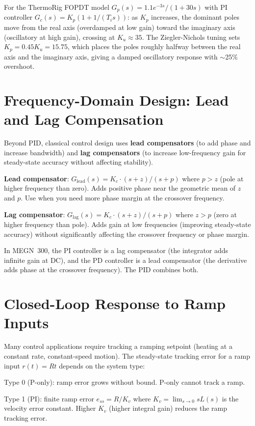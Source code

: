 \documentclass[11pt,letterpaper,twoside,openany]{book}
\begin{document}
For the ThermoRig FOPDT model $G_p(s) = 1.1 e^{-3s}/(1+30s)$ with PI controller $G_c(s) = K_p(1 + 1/(T_i s))$: as $K_p$ increases, the dominant poles move from the real axis (overdamped at low gain) toward the imaginary axis (oscillatory at high gain), crossing at $K_u \approx 35$. The Ziegler-Nichols tuning sets $K_p = 0.45 K_u = 15.75$, which places the poles roughly halfway between the real axis and the imaginary axis, giving a damped oscillatory response with $\sim$25\% overshoot.

\section{Frequency-Domain Design: Lead and Lag Compensation}
Beyond PID, classical control design uses \textbf{lead compensators} (to add phase and increase bandwidth) and \textbf{lag compensators} (to increase low-frequency gain for steady-state accuracy without affecting stability).

\textbf{Lead compensator}: $G_{\text{lead}}(s) = K_c \cdot (s + z)/(s + p)$ where $p > z$ (pole at higher frequency than zero). Adds positive phase near the geometric mean of $z$ and $p$. Use when you need more phase margin at the crossover frequency.

\textbf{Lag compensator}: $G_{\text{lag}}(s) = K_c \cdot (s + z)/(s + p)$ where $z > p$ (zero at higher frequency than pole). Adds gain at low frequencies (improving steady-state accuracy) without significantly affecting the crossover frequency or phase margin.

In MEGN~300, the PI controller is a lag compensator (the integrator adds infinite gain at DC), and the PD controller is a lead compensator (the derivative adds phase at the crossover frequency). The PID combines both.

\section{Closed-Loop Response to Ramp Inputs}
Many control applications require tracking a ramping setpoint (heating at a constant rate, constant-speed motion). The steady-state tracking error for a ramp input $r(t) = Rt$ depends on the system type:

Type 0 (P-only): ramp error grows without bound. P-only cannot track a ramp.

Type 1 (PI): finite ramp error $e_{ss} = R/K_v$ where $K_v = \lim_{s \to 0} sL(s)$ is the velocity error constant. Higher $K_v$ (higher integral gain) reduces the ramp tracking error.
\end{document}
